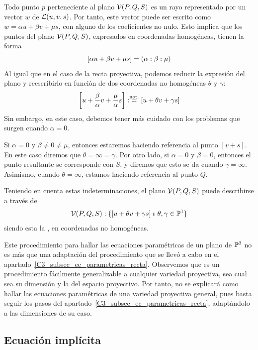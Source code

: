 Todo punto $p$ perteneciente al plano $\mathcal{V}(P,Q,S)$ es un rayo representado por un vector $w$ de $\mathcal{L}(u,v,s)$. Por tanto, este vector puede ser escrito como $w=\alpha u +\beta v+\mu s$, con alguno de los coeficientes no nulo. Esto implica que los puntos del plano $\mathcal{V}(P,Q,S)$, expresados en coordenadas homogéneas, tienen la forma
\[\left [ \alpha u+\beta v+\mu s \right ]=(\alpha:\beta:\mu)\]
Al igual que en el caso de la recta proyectiva, podemos reducir la expresión del plano y reescribirlo en función de dos coordenadas no homogéneas $\theta$ y $\gamma$:
\[\left [ u+\frac{\beta}{\alpha}v+\frac{\mu}{\alpha}s \right ]:\stackrel{\textrm{not.}}{=}\left [ u+\theta v+\gamma s \right ]\]
Sin embargo, en este caso, debemos tener más cuidado con los problemas que surgen cuando $\alpha=0$.

Si $\alpha=0$ y $\beta\not=0\not=\mu$, entonces estaremos haciendo referencia al punto $[v+s]$. En este caso diremos que $\theta=\infty=\gamma$. Por otro lado, si $\alpha=0$ y $\beta=0$, entonces el punto resultante se corresponde con $S$, y diremos que esto se da cuando $\gamma=\infty$. Asimismo, cuando $\theta=\infty$, estamos haciendo referencia al punto $Q$.

Teniendo en cuenta estas indeterminaciones, el plano $\mathcal{V}(P,Q,S)$ puede describirse a través de
\begin{equation}
\label{C3_eq_descripcionPlanoP1}
\mathcal{V}(P,Q,S):\{\left [ u+\theta v+\gamma s \right ]\shortparallel \theta,\gamma\in\mathbb{P}^1\}
\end{equation}
siendo esta la , en coordenadas no homogéneas.

\begin{obs}
	Este procedimiento para hallar las ecuaciones paramétricas de un plano de $\mathbb{P}^3$ no es más que una adaptación del procedimiento que se llevó a cabo en el apartado~\ref{C3_subsec_ec_parametricas_recta}. Observemos que es un procedimiento fácilmente generalizable a cualquier variedad proyectiva, sea cual sea su dimensión y la del espacio proyectivo. Por tanto, no se explicará como hallar las ecuaciones paramétricas de una variedad proyectiva general, pues basta seguir los pasos del apartado~\ref{C3_subsec_ec_parametricas_recta}, adaptándolo a las dimensiones de su caso.
\end{obs}

\subsection{Ecuación implícita}

